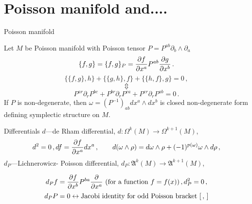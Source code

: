 \documentclass{beamer}
\def\w {{\omega}}
\def\p{\partial}
\def\p {\partial}
\begin{document}
\section {Poisson manifold and....}
\begin{frame}{Poisson manifold}

 Let $M$ be Poisson manifold with Poisson tensor $P=P^{ab}\p_b\wedge \p_a$
               $$
\{f,g\}=\{f,g\}_P={\p f\over \p x^a}P^{ab}{\p g\over \p x^b}\,.
               $$
               $$
\{\{f,g\},h\}+\{\{g,h\},f\}+\{\{h,f\},g\}=0\,,
        $$
        $$
      \Updownarrow
        $$
        $$
    P^{ar}\p_r P^{bc}+
    P^{br}\p_r P^{ca}+
    P^{cr}\p_r P^{ab}=0\,.
               $$
If $P$ is non-degenerate, then $\w=(P^{-1})_{ab}dx^a\wedge dx^b$
is closed non-degenerate form defining symplectic structure on $M$.

\end{frame}
\begin{frame}{Differentials}
$d$---de Rham differential, $d\colon \Omega^k(M)\to \Omega^{k+1}(M)$, 
          $$
d^2=0\,, df={\p f\over \p x^a}dx^a\,,\qquad
  d(\w\wedge\rho)=d\w\wedge \rho+(-1)^{p(\w)}\w\wedge d\rho\,,
     $$
$d_P$---Lichnerowicz- Poisson differential,
  $d_P\colon \mathfrak{A}^k(M)\to \mathfrak{A}^{k+1}(M)$, 
 
         $$
d_Pf={\p f\over \p x^b}P^{ba}{\p\over \p x^a}\,\,
   (\hbox{for a function $f=f(x)$})\,,d_P^2=0\,,
         $$
         $$
 d_P P=0\leftrightarrow \hbox {Jacobi identity for odd Poisson bracket 
$[\,,\,]$}
         $$


\end{frame}
\end{document}

